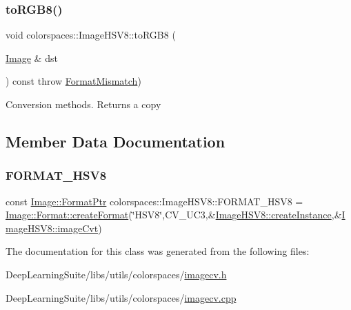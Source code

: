 \mbox{\label{classcolorspaces_1_1_image_h_s_v8_ada6b9204de1a0f9a3c6c47744203fed1}} 
\subsubsection{\texorpdfstring{to\+R\+G\+B8()}{toRGB8()}}
{\footnotesize\ttfamily void colorspaces\+::\+Image\+H\+S\+V8\+::to\+R\+G\+B8 (\begin{DoxyParamCaption}\item[{\hyperlink{classcolorspaces_1_1_image}{Image} \&}]{dst }\end{DoxyParamCaption}) const throw  \hyperlink{classcolorspaces_1_1_image_1_1_format_mismatch}{Format\+Mismatch}) }

Conversion methods. Returns a copy 

\subsection{Member Data Documentation}
\mbox{\label{classcolorspaces_1_1_image_h_s_v8_ac6257ac7a1d55ddf8347f19c163abfa2}} 
\subsubsection{\texorpdfstring{F\+O\+R\+M\+A\+T\+\_\+\+H\+S\+V8}{FORMAT\_HSV8}}
{\footnotesize\ttfamily const \hyperlink{classcolorspaces_1_1_image_ab3978cc7acc2b5e855f8c715f09667d1}{Image\+::\+Format\+Ptr} colorspaces\+::\+Image\+H\+S\+V8\+::\+F\+O\+R\+M\+A\+T\+\_\+\+H\+S\+V8 = \hyperlink{classcolorspaces_1_1_image_1_1_format_ae79208f237b72cf596331ebcec2ff58b}{Image\+::\+Format\+::create\+Format}(\char`\"{}H\+S\+V8\char`\"{},C\+V\+\_\+U\+C3,\&\hyperlink{classcolorspaces_1_1_image_h_s_v8_a2902afeba297cbf8c9278c567c943966}{Image\+H\+S\+V8\+::create\+Instance},\&\hyperlink{classcolorspaces_1_1_image_h_s_v8_a95bd0f819144ad097ab64ec82051f796}{Image\+H\+S\+V8\+::image\+Cvt})\hspace{0.3cm}{\ttfamily [static]}}



The documentation for this class was generated from the following files\+:\begin{DoxyCompactItemize}
\item 
Deep\+Learning\+Suite/libs/utils/colorspaces/\hyperlink{imagecv_8h}{imagecv.\+h}\item 
Deep\+Learning\+Suite/libs/utils/colorspaces/\hyperlink{imagecv_8cpp}{imagecv.\+cpp}\end{DoxyCompactItemize}
